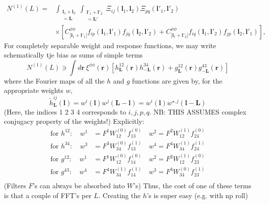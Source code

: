 \documentclass[11pt]{article}
\begin{document}
\newcommand{\bl}{\boldsymbol{l}}
\newcommand{\br}{\boldsymbol{r}}
\newcommand{\hn}[0]{{\hat n}}

\newcommand{\bll}{\boldsymbol{L}}
\newcommand{\intL}{\int_{\substack{\bl_1 + \bl_2 \\ =\bll }}}
\newcommand{\intLp}{\int_{\substack{\bl'_1 + \bl'_2 \\ =\bll' }}}

\begin{equation}
\begin{split}
N^{(1)}(L) = &\intL \intLp \Xi_{ij}(\bl_1, \bl_2) \Xi_{pq}(\bl'_1, \bl'_2) \\ &\times\left[ C^{\phi \phi}_{|\bl_1+\bl'_1|}f_{ip}(\bl_1, \bl'_1) f_{jq}(\bl_2, \bl'_2) + C^{\phi \phi}_{|\bl_1+\bl'_2|}f_{iq}(\bl_1, \bl'_2) f_{jp}(\bl_2, \bl'_1) \right] ,
\end{split}
\end{equation}
For completely separable weight and response functions, we may write schematically tje bias as sums of simple terms
\begin{equation}
	N^{(1)}(L) \ni  \int d\br\: \xi^{\phi \phi}(\br)\left[ h^{12}_{\bll}(\br) h^{34}_{-\bll}(\br) + g^{12}_{\bll}(\br) g^{43}_{-\bll}(\br)\right ]
\end{equation}
where the Fourier maps of all the $h$ and $g$ functions are given by, for the appropriate weights $w$,
\begin{equation}
	\tilde h^{ij}_{\bll}(\bl) =  w^i(\bl) w^j(\bll - \bl) = w^i(\bl) w^{\star, j}(\bl - \bll)
\end{equation}
(Here, the indices 1 2 3 4 corresponds to $i,j,p,q$. NB: THIS ASSUMES complex conjugacy property of the weights!)
Explicitly:
\begin{equation}
\begin{split}
\textrm{for }h^{12}:\quad w^1 &= F^1 W_{12}^{(0)} f^{(0)}_{13}	\quad w^2 = F^2W_{12}^{(1)}f^{(0)}_{24} \\
\textrm{for }h^{34}:\quad w^3 &= F^3 W_{34}^{(0)} f^{(1)}_{13}	\quad w^4 = F^4W_{34}^{(1)}f^{(1)}_{24} \\
\textrm{for }g^{12}:\quad w^1 &= F^1 W_{12}^{(0)} f^{(0)}_{14}	\quad w^2 = F^2W_{12}^{(1)}f^{(0)}_{23} \\
\textrm{for }g^{43}:\quad w^4 &= F^4 W_{34}^{(1)} f^{(1)}_{14}	\quad w^3 = F^3W_{34}^{(0)}f^{(1)}_{23} \\
\end{split}
\end{equation}
(Filters $F$'s can always be absorbed into $W$'s)
Thus, the cost of one of these terms is that a couple of FFT's per $L$. Creating the $h$'s is super easy (e.g. with np roll)
\end{document}
